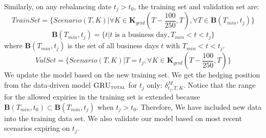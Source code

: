 \documentclass[letterpaper,12pt,titlepage,oneside,final]{book}
\numberwithin{equation}{section}
\theoremstyle{definition}
\newcommand{\modelT}{\textsc{GRU}_{\textsc{total}}}
\begin{document}
\begin{steps}
	
	
	
	\item Similarly, on any rebalancing date $t_j>t_0$,  the training set  and validation set are: 
	\[TrainSet=\{Scenario(T,K)|\forall K \in \mathbf{K}_{grid}(T-\frac{100}{250},T),\forall T \in \mathbf{B}(T_{min},t_j)\}\]
	\[
	\mathbf{B}(T_{min},t_j)=\{ t|t \text{ is a business day},  T_{min}< t <t_j\} 
	\]
	where $\mathbf{B}(T_{min},t_j)$ is the set of all business days $t$ with  $T_{min}< t <t_j$.
	\[ValSet=\{Scenario(T,K)|T=t_j, \forall K  \in \mathbf{K}_{grid}(T-\frac{100}{250},T)\}\]
	We update the model based on the new training set. We get the hedging position from the data-driven model $\modelT$ for $t_j$ only: $\delta^{M}_{t_j,T,K}$. Notice that  the range for the allowed expiries in the training set is extended because $\mathbf{B}(T_{min},t_0) \subset \mathbf{B}(T_{min},t_j)$ when  $t_j>t_0$. Therefore, We have included new data into the training data set. We also validate our model based on most recent scenarios expiring on $t_j$.
\end{steps}
\end{document}
